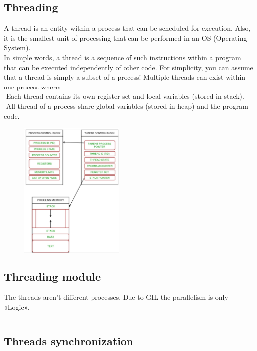 \subsection{Threading}



A thread is an entity within a process that can be scheduled for execution. Also, it is the smallest unit of processing that can be performed in an OS (Operating System).\\
In simple words, a thread is a sequence of such instructions within a program that can be executed
independently of other code. For simplicity, you can
assume that a thread is simply a subset of a
process!
Multiple threads can exist within one process where:\\
-Each thread contains its own register set and local variables (stored in stack).\\
-All thread of a process share global variables (stored in heap) and the program code.

\begin{figure}[ht]
    \centering
    \includegraphics[width=0.45\textwidth]{figure_parallel/thread.png}\end{figure}
\FloatBarrier

\subsection{Threading module}



The threads aren’t different processes. Due to GIL the parallelism is only «Logic».

\inputminted{python}{python_parallel/thread1.py}


\subsection{Threads synchronization}

